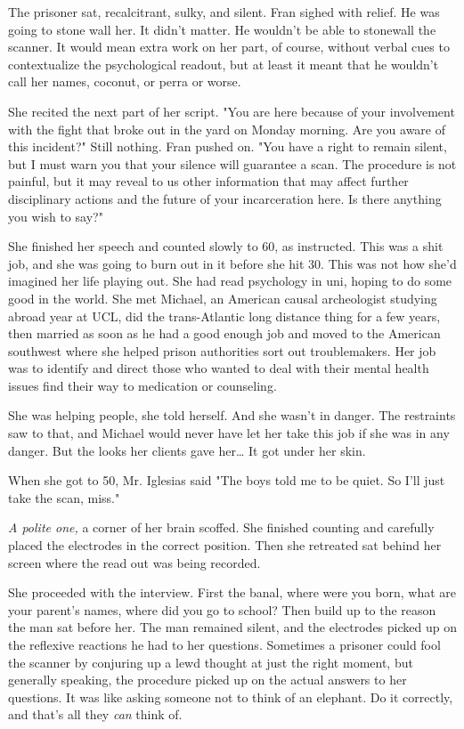 \documentclass{article}
\begin{document}
The prisoner sat, recalcitrant, sulky, and silent. Fran sighed with relief. He was going to stone wall her. It didn’t matter. He wouldn’t be able to stonewall the scanner. It would mean extra work on her part, of course, without verbal cues to contextualize the psychological readout, but at least it meant that he wouldn’t call her names, coconut, or perra or worse.

She recited the next part of her script. "You are here because of your involvement with the fight that broke out in the yard on Monday morning. Are you aware of this incident?" Still nothing. Fran pushed on. "You have a right to remain silent, but I must warn you that your silence will guarantee a scan. The procedure is not painful, but it may reveal to us other information that may affect further disciplinary actions and the future of your incarceration here. Is there anything you wish to say?"

She finished her speech and counted slowly to 60, as instructed. This was a shit job, and she was going to burn out in it before she hit 30. This was not how she’d imagined her life playing out. She had read psychology in uni, hoping to do some good in the world. She met Michael, an American causal archeologist studying abroad year at UCL, did the trans-Atlantic long distance thing for a few years, then married as soon as he had a good enough job and moved to the American southwest where she helped prison authorities sort out troublemakers. Her job was to identify and direct those who wanted to deal with their mental health issues find their way to medication or counseling. 

She was helping people, she told herself. And she wasn’t in danger. The restraints saw to that, and Michael would never have let her take this job if she was in any danger. But the looks her clients gave her… It got under her skin. 

When she got to 50, Mr. Iglesias said "The boys told me to be quiet. So I'll just take the scan, miss."

\emph{A polite one,} a corner of her brain scoffed. She finished counting and carefully placed the electrodes in the correct position. Then she retreated sat behind her screen where the read out was being recorded. 

She proceeded with the interview. First the banal, where were you born, what are your parent’s names, where did you go to school? Then build up to the reason the man sat before her. The man remained silent, and the electrodes picked up on the reflexive reactions he had to her questions. Sometimes a prisoner could fool the scanner by conjuring up a lewd thought at just the right moment, but generally speaking, the procedure picked up on the actual answers to her questions. It was like asking someone not to think of an elephant. Do it correctly, and that’s all they \emph{can} think of.
\end{document}
